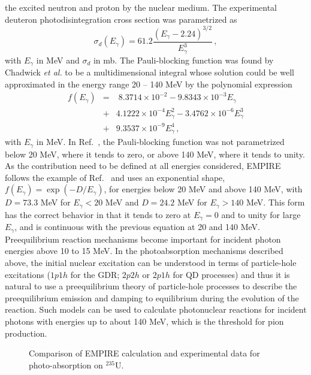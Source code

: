 \documentclass[twocolumn,amsmath,amssymb,10pt,groupedaddress,a4paper]{revtex4}
\begin{document}
the excited neutron and proton by the nuclear medium. The experimental
deuteron photodisintegration cross section was parametrized as
\begin{equation}
\sigma_{d}(E_{\gamma})=61.2\frac{(E_{\gamma}-2.24)^{3/2}}{E_{\gamma}^{3}}\,,
\end{equation}
with $E_{\gamma}$ in MeV and $\sigma_{d}$ in mb. The Pauli-blocking
function was found by Chadwick \emph{et al.} to be a multidimensional
integral whose solution could be well approximated in the energy range
20 -- 140 MeV by the polynomial expression
\begin{eqnarray}
f(E_{\gamma}) & = & \;8.3714\times10^{-2}-9.8343\times10^{-3}E_{\gamma}\nonumber\\
&+&4.1222\times10^{-4}E_{\gamma}^{2} -3.4762\times10^{-6}E_{\gamma}^{3}\nonumber\\
&+&9.3537\times10^{-9}E_{\gamma}^{4}\,,
\end{eqnarray}
with $E_{\gamma}$ in MeV. In Ref.~\cite{chadQD}, the Pauli-blocking
function was not parametrized below 20 MeV, where it tends to zero,
or above 140 MeV, where it tends to unity. As the contribution need
to be defined at all energies considered, EMPIRE follows the example
of Ref.~\cite{PHNuc} and uses an exponential shape, $f(E_{\gamma})=\exp(-D/E_{\gamma})$,
for energies below 20 MeV and above 140 MeV, with $D=73.3$ MeV for
$E_{\gamma}<20$ MeV and $D=24.2$ MeV for $E_{\gamma}>140$ MeV.
This form has the correct behavior in that it tends to zero at $E_{\gamma}=0$
and to unity for large $E_{\gamma}$, and is continuous with the previous
equation at 20 and 140 MeV.
Preequilibrium reaction mechanisms become important for incident photon
energies above 10 to 15 MeV. In the photoabsorption mechanisms described
above, the initial nuclear excitation can be understood in terms of
particle-hole excitations ($1p1h$ for the GDR; $2p2h$ or $2p1h$
for QD processes) and thus it is natural to use a preequilibrium theory
of particle-hole processes to describe the preequilibrium emission
and damping to equilibrium during the evolution of the reaction. Such
models can be used to calculate photonuclear reactions for incident
photons with energies up to about 140 MeV, which is the threshold
for pion production.
\begin{figure}[htbp]
\caption{Comparison of EMPIRE calculation and experimental data for
photo-absorption on $^{235}$U.}
\label{u235abs}
\end{figure}
\end{document}
